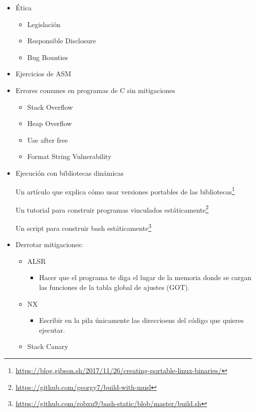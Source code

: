 \documentclass[
  12,
]{scrartcl}
\DeclareRobustCommand{\href}[2]{#2\footnote{\url{#1}}}
\providecommand{\tightlist}{%
  \setlength{\itemsep}{0pt}\setlength{\parskip}{0pt}}
\begin{document}
\begin{itemize}
\item
  Ética

  \begin{itemize}
  \tightlist
  \item
    Legislación
  \item
    Responsible Disclosure
  \item
    Bug Bounties
  \end{itemize}
\item
  Ejercicios de ASM
\item
  Errores comunes en programas de C sin mitigaciones

  \begin{itemize}
  \tightlist
  \item
    Stack Overflow
  \item
    Heap Overflow
  \item
    Use after free
  \item
    Format String Vulnerability
  \end{itemize}
\item
  Ejecución con bibliotecas dinámicas

  \href{https://blog.gibson.sh/2017/11/26/creating-portable-linux-binaries/}{Un
  artículo que explica cómo usar versiones portables de las bibliotecas}

  \href{https://github.com/georgy7/build-with-musl}{Un tutorial para
  construir programas vinculados estáticamente}

  \href{https://github.com/robxu9/bash-static/blob/master/build.sh}{Un
  script para construir bash estáticamente}
\item
  Derrotar mitigaciones:

  \begin{itemize}
  \item
    ALSR

    \begin{itemize}
    \tightlist
    \item
      Hacer que el programa te diga el lugar de la memoria donde se
      cargan las funciones de la tabla global de ajustes (GOT).
    \end{itemize}
  \item
    NX

    \begin{itemize}
    \tightlist
    \item
      Escribir en la pila únicamente las direccioens del código que
      quieres ejecutar.
    \end{itemize}
  \item
    Stack Canary


\end{itemize}
\end{itemize}
\end{document}
